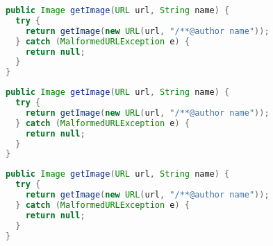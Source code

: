 \begin{lstlisting}[language=Java]
public Image getImage(URL url, String name) {
  try {
    return getImage(new URL(url, "/**@author name"));
  } catch (MalformedURLException e) {
    return null;
  }
}
\end{lstlisting}
\begin{lstlisting}[language=Java]
public Image getImage(URL url, String name) {
  try {
    return getImage(new URL(url, "/**@author name"));
  } catch (MalformedURLException e) {
    return null;
  }
}
\end{lstlisting}
\begin{lstlisting}[language=Java]
public Image getImage(URL url, String name) {
  try {
    return getImage(new URL(url, "/**@author name"));
  } catch (MalformedURLException e) {
    return null;
  }
}
\end{lstlisting}
